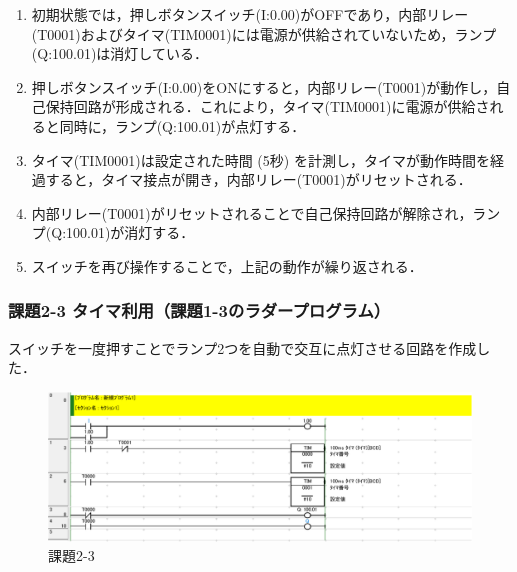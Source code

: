 \begin{enumerate}
    \item 初期状態では，押しボタンスイッチ(I:0.00)がOFFであり，内部リレー(T0001)およびタイマ(TIM0001)には電源が供給されていないため，ランプ(Q:100.01)は消灯している．
    \item 押しボタンスイッチ(I:0.00)をONにすると，内部リレー(T0001)が動作し，自己保持回路が形成される．これにより，タイマ(TIM0001)に電源が供給されると同時に，ランプ(Q:100.01)が点灯する．
    \item タイマ(TIM0001)は設定された時間 (5秒) を計測し，タイマが動作時間を経過すると，タイマ接点が開き，内部リレー(T0001)がリセットされる．
    \item 内部リレー(T0001)がリセットされることで自己保持回路が解除され，ランプ(Q:100.01)が消灯する．
    \item スイッチを再び操作することで，上記の動作が繰り返される．
\end{enumerate}


\subsubsection*{課題2-3 タイマ利用（課題1-3のラダープログラム）}
スイッチを一度押すことでランプ2つを自動で交互に点灯させる回路を作成した．
\begin{figure}[H]
  \centering
  \includegraphics[scale=1]{sozai/2-3-crop.pdf}
  \caption{課題2-3}
\end{figure}
 
